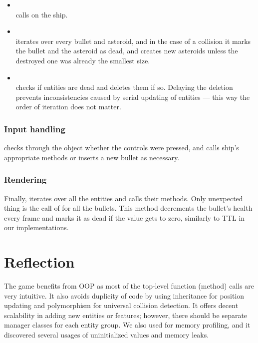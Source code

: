 \documentclass[
  digital, %
  color,   %
  table,   %
  oneside, %
  lof,     %
  lot,     %
]{fithesis3}
\begin{document}
{\begin{itemize}[--]
    \item {}\\
    calls  on the ship.

    \item {}\\
    iterates over every bullet and asteroid, and in the case of a collision it
    marks the bullet and the asteroid as dead, and creates new asteroids
    unless the destroyed one was already the smallest size.

    \item {}\\
    checks if entities are dead and deletes them if so.
    Delaying the deletion prevents inconsistencies caused by serial
    updating of entities --- this way the order of iteration does not matter.
\end{itemize}

\subsubsection{Input handling}
 checks through the  object
whether the controls were pressed, and calls ship's appropriate methods or
inserts a new bullet as necessary.

\subsubsection{Rendering}
Finally,  iterates over all the entities and calls their
 methods.
Only unexpected thing is the call of  for all the bullets.
This method decrements the bullet's health every frame and marks it as dead
if the value gets to zero, similarly to TTL in our implementations.



\section{Reflection}
The game benefits from OOP as most of the top-level function (method) calls
are very intuitive. It also avoids duplicity of code by using inheritance for position updating
and polymorphism for universal collision detection.
It offers decent scalability in adding new entities or features;
however, there should be separate manager classes for each entity group.
We also used  for memory profiling, and it discovered
several usages of uninitialized values and memory leaks.

}
\end{document}
